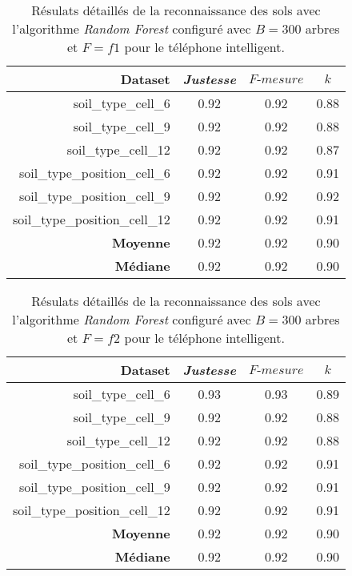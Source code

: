 \begin{table}[H]\renewcommand{\arraystretch}{0.5}
	\centering
	\caption{Résulats détaillés de la reconnaissance des sols avec l'algorithme \textit{Random Forest} configuré avec $B=300$ arbres et $F=f1$ pour le téléphone intelligent.}
	\label{tab:rf-300-f1-cell}
	\begin{tabular}{@{}rccc@{}}
		\toprule
			\textbf{Dataset} & \textit{Justesse} & $F\mbox{-} mesure$ & \textbf{$k$} \\
		\midrule
			soil\_type\_cell\_6 & 0.92 & 0.92 & 0.88 \\
			soil\_type\_cell\_9 & 0.92 & 0.92 & 0.88 \\
			soil\_type\_cell\_12 & 0.92 & 0.92 & 0.87 \\
			soil\_type\_position\_cell\_6 & 0.92 & 0.92 & 0.91 \\
			soil\_type\_position\_cell\_9 & 0.92 & 0.92 & 0.92 \\
			soil\_type\_position\_cell\_12 & 0.92 & 0.92 & 0.91 \\
			\textbf{Moyenne} & 0.92 & 0.92 & 0.90 \\
			\textbf{Médiane} & 0.92 & 0.92 & 0.90 \\
		\bottomrule
	\end{tabular}
\end{table}

\begin{table}[H]\renewcommand{\arraystretch}{0.5}
	\centering
	\caption{Résulats détaillés de la reconnaissance des sols avec l'algorithme \textit{Random Forest} configuré avec $B=300$ arbres et $F=f2$ pour le téléphone intelligent.}
	\label{tab:rf-300-f2-cell}
	\begin{tabular}{@{}rccc@{}}
		\toprule
			\textbf{Dataset} & \textit{Justesse} & $F\mbox{-} mesure$ & \textbf{$k$} \\
		\midrule
			soil\_type\_cell\_6 & 0.93 & 0.93 & 0.89 \\
			soil\_type\_cell\_9 & 0.92 & 0.92 & 0.88 \\
			soil\_type\_cell\_12 & 0.92 & 0.92 & 0.88 \\
			soil\_type\_position\_cell\_6 & 0.92 & 0.92 & 0.91 \\
			soil\_type\_position\_cell\_9 & 0.92 & 0.92 & 0.91 \\
			soil\_type\_position\_cell\_12 & 0.92 & 0.92 & 0.91 \\
			\textbf{Moyenne} & 0.92 & 0.92 & 0.90 \\
			\textbf{Médiane} & 0.92 & 0.92 & 0.90 \\
		\bottomrule
	\end{tabular}
\end{table}

